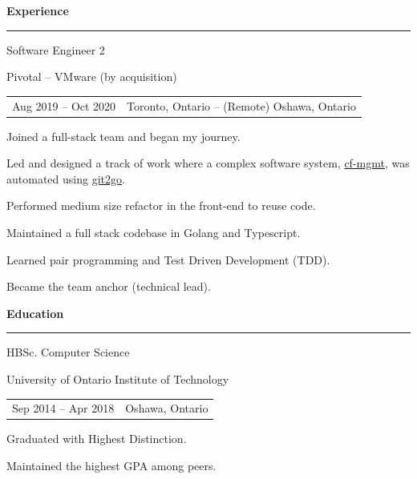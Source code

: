 \documentclass[letterpaper]{article}
\newcommand{\primary}{\color{primary}}
\newcommand{\primarydark}{\color{primarydark}}
\newcommand{\complementary}{\color{complementary}}
\newcommand{\mapMarker}{\faMapMarker*[alt]}
\newenvironment{heading}[1]{%
  {\LARGE \primarydark \textbf{#1}}\\ {\complementary
    \rule[5pt]{\linewidth}{0.6pt}}
}
{\par\vspace{8pt}}
\newcommand{\blockend}{\vspace{4pt}}
\newenvironment{experience}[4]{
  { #1 \par}
  {\small \primary #2 \par}
  \begin{tabularx}{\linewidth}{ l l }
    { \small \faCalendar \space #3 } & { \small \mapMarker \space #4 }
  \end{tabularx}%
}{
  \blockend{}
}
\newenvironment{itemize*}%
{\begin{itemize}[topsep=0pt,leftmargin=20pt]%
    \setlength{\itemsep}{0pt}%
    \setlength{\parsep}{0pt}%
    \setlength{\parskip}{0pt}%
    \small%
  }%
  {\end{itemize}}
\begin{document}
\begin{minipage}[t]{0.59\textwidth}
\begin{heading}{Experience}
    \begin{experience}{Software Engineer 2}
      {Pivotal -- VMware (by acquisition)}
      {Aug 2019 -- Oct 2020}
      {Toronto, Ontario -- (Remote) Oshawa, Ontario}
      Joined a full-stack team and began my journey.
      \begin{itemize*}
      \item Led and designed a track of work where a complex software system,
        \href{https://github.com/vmware-tanzu-labs/cf-mgmt}{cf-mgmt}, was
        automated using \href{https://github.com/libgit2/git2go}{git2go}.
        \item Performed medium size refactor in the front-end to reuse code.
        \item Maintained a full stack codebase in Golang and Typescript.
        \item Learned pair programming and Test Driven Development (TDD).
        \item Became the team anchor (technical lead).
      \end{itemize*}
    \end{experience}

    \begin{heading}{Education}
      \begin{experience}{HBSc. Computer Science}
        {University of Ontario Institute of Technology}
        {Sep 2014 -- Apr 2018}
        {Oshawa, Ontario}
        \begin{itemize*}
          \item Graduated with Highest Distinction.
          \item Maintained the highest GPA among peers.
        \end{itemize*}
      \end{experience}
    \end{heading}
  \end{heading}

\end{minipage}%
\hspace{0.02\textwidth}%
\end{document}
